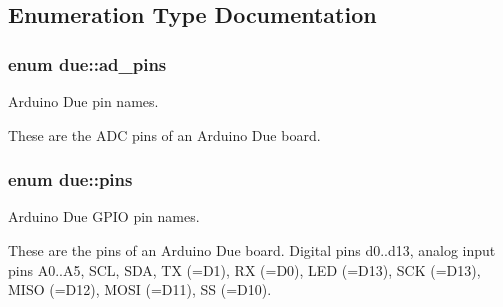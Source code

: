 \subsection{Enumeration Type Documentation}
\subsubsection[{\texorpdfstring{ad\+\_\+pins}{ad_pins}}]{\setlength{\rightskip}{0pt plus 5cm}enum {\bf due\+::ad\+\_\+pins}\hspace{0.3cm}{\ttfamily [strong]}}\hypertarget{namespacedue_a5ecc98d40585c91eabbfb14f71bd7d4c}{}\label{namespacedue_a5ecc98d40585c91eabbfb14f71bd7d4c}


Arduino Due pin names. 

These are the A\+DC pins of an Arduino Due board. 
\subsubsection[{\texorpdfstring{pins}{pins}}]{\setlength{\rightskip}{0pt plus 5cm}enum {\bf due\+::pins}\hspace{0.3cm}{\ttfamily [strong]}}\hypertarget{namespacedue_a8ffa3ec309934ff9db34317e504bcc92}{}\label{namespacedue_a8ffa3ec309934ff9db34317e504bcc92}


Arduino Due G\+P\+IO pin names. 

These are the pins of an Arduino Due board. Digital pins d0..d13, analog input pins A0..A5, S\+CL, S\+DA, TX (=D1), RX (=D0), L\+ED (=D13), S\+CK (=D13), M\+I\+SO (=D12), M\+O\+SI (=D11), SS (=D10). 